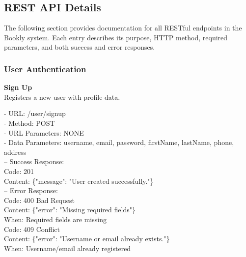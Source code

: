 \subsection*{REST API Details}

The following section provides documentation for all RESTful endpoints in the Bookly system. Each entry describes its purpose, HTTP method, required parameters, and both success and error responses.

\subsubsection*{User Authentication}

\begin{flushleft}
    \textbf{Sign Up} \\
    Registers a new user with profile data.

    - URL: /user/signup \\
    - Method: POST \\
    - URL Parameters: NONE \\
    - Data Parameters: username, email, password, firstName, lastName, phone, address \\
    – Success Response: \\
    Code: 201 \\
    Content: \{"message": "User created successfully."\} \\
    – Error Response: \\
    Code: 400 Bad Request \\
    Content: \{"error": "Missing required fields"\} \\
    When: Required fields are missing \\
    Code: 409 Conflict \\
    Content: \{"error": "Username or email already exists."\} \\
    When: Username/email already registered
\end{flushleft}


